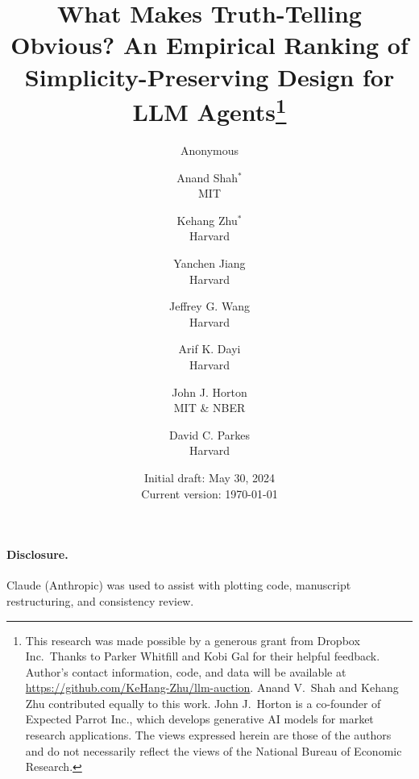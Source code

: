 \documentclass{article}
\title{What Makes Truth-Telling Obvious? An Empirical Ranking of Simplicity-Preserving Design for LLM Agents\ifanon\else\thanks{
  \footnotesize
  This research was made possible by a generous grant from Dropbox Inc.\ Thanks to Parker Whitfill and Kobi Gal for their helpful feedback. Author's contact information, code, and data will be available at \url{https://github.com/KeHang-Zhu/llm-auction}. Anand V.\ Shah and Kehang Zhu contributed equally to this work. John J.\ Horton is a co-founder of Expected Parrot Inc., which develops generative AI models for market research applications. The views expressed herein are those of the authors and do not necessarily reflect the views of the National Bureau of Economic Research.
}\fi}
\author{Anonymous}
\author{
  Anand Shah$^{*}$\\
  MIT \\
  \and
  Kehang Zhu$^{*}$\\
  Harvard  \\
  \and
  Yanchen Jiang \\
  Harvard \\
  \and
  Jeffrey G. Wang \\
  Harvard \\
  \and
  Arif K. Dayi \\
  Harvard \\
  \and
  John J. Horton \\
  MIT \& NBER \\
  \and
  David C. Parkes \\
  Harvard \\
}
\date{
Initial draft: May 30, 2024 \\
Current version: \today
}
\newif\ifanon
\begin{document}
\maketitle



\newpage











\ifanon
\paragraph{Disclosure.} An AI assistant was used to assist with plotting code, manuscript restructuring, and consistency review; details withheld for anonymous review.
\else
\paragraph{Disclosure.} Claude (Anthropic) was used to assist with plotting code, manuscript restructuring, and consistency review.
\fi




\newpage
\appendix









\end{document}
